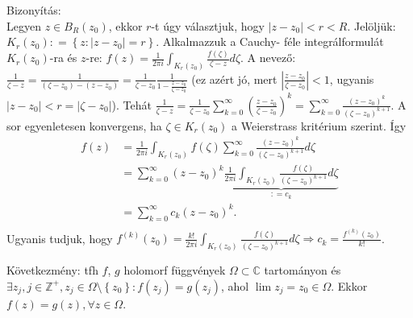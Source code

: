 \documentclass[12pt,a4paper]{scrartcl}
\newenvironment{bizonyitas}{}{}
\begin{document}
\begin{bizonyitas}

Bizonyítás:\\
Legyen \(z \in B_{R}\left( z_{0} \right)\), ekkor \(r\)-t úgy
választjuk, hogy \(\left| {z - z_{0}} \right| < r < R\). Jelöljük:
\(K_{r}\left( z_{0} \right): = \left\{ {z:\left| {z - z_{0}} \right| = r} \right\}\).
Alkalmazzuk a Cauchy- féle integrálformulát
\(K_{r}\left( z_{0} \right)\)-ra és \(z\)-re:
\(f\left( z \right) = \frac{1}{2\pi i}{\int_{K_{r}{(z_{0})}}{\frac{f\left( \zeta \right)}{\zeta - z}d\zeta}}\).
A nevező:
\(\frac{1}{\zeta - z} = \frac{1}{\left( {\zeta - z_{0}} \right) - \left( {z - z_{0}} \right)} = \frac{1}{\zeta - z_{0}}\frac{1}{1 - \frac{z - z_{0}}{\zeta - z_{0}}}\)
(ez azért jó, mert
\(\left| \frac{z - z_{0}}{\zeta - z_{0}} \right| < 1\), ugyanis
\(\left| {z - z_{0}} \right| < r = \left| {\zeta - z_{0}} \right|\)).
Tehát
\(\frac{1}{\zeta - z} = \frac{1}{\zeta - z_{0}}{\sum\limits_{k = 0}^{\infty}\left( \frac{z - z_{0}}{\zeta - z_{0}} \right)^{k}} = {\sum\limits_{k = 0}^{\infty}\frac{\left( {z - z_{0}} \right)^{k}}{\left( {\zeta - z_{0}} \right)^{k + 1}}}\).
A sor egyenletesen konvergens, ha
\(\zeta \in K_{r}\left( z_{0} \right)\) a Weierstrass kritérium szerint.
Így \[\begin{aligned}
  f\left( z \right) &  = \frac{1}{{2\pi i}}\int_{{K_r}({z_0})} {f\left( \zeta  \right)\sum\limits_{k = 0}^\infty  {\frac{{{{\left( {z - {z_0}} \right)}^k}}}{{{{\left( {\zeta  - {z_0}} \right)}^{k + 1}}}}} d\zeta }  \\ 
   &  = \sum\limits_{k = 0}^\infty  {{{\left( {z - {z_0}} \right)}^k}\underbrace {\frac{1}{{2\pi i}}\int_{{K_r}({z_0})} {\frac{{f\left( \zeta  \right)}}{{{{\left( {\zeta  - {z_0}} \right)}^{k + 1}}}}d\zeta } }_{: = {c_k}}}  \\ 
   &  = \sum\limits_{k = 0}^\infty  {{c_k}{{\left( {z - {z_0}} \right)}^k}}.  \\ 
\end{aligned} \] Ugyanis tudjuk, hogy
\(\left. f^{(k)}\left( z_{0} \right) = \frac{k!}{2\pi i}{\int_{K_{r}{(z_{0})}}{\frac{f\left( \zeta \right)}{\left( {\zeta - z_{0}} \right)^{k + 1}}d\zeta}}\Rightarrow c_{k} = \frac{f^{(k)}\left( z_{0} \right)}{k!} \right.\).

\end{bizonyitas}

Következmény: tfh \(f\), \(g\) holomorf függvények
\(\Omega \subset {\mathbb{C}}\) tartományon és
\(\exists z_{j},j \in {\mathbb{Z}}^{+},z_{j} \in \Omega\text{\textbackslash}\left\{ z_{0} \right\}:f\left( z_{j} \right) = g\left( z_{j} \right)\),
ahol \(\lim z_{j} = z_{0} \in \Omega\). Ekkor
\(f\left( z \right) = g\left( z \right),\forall z \in \Omega\).
\end{document}
